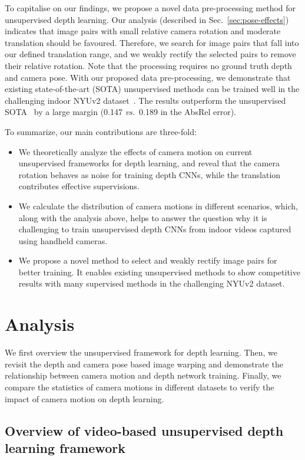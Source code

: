 \documentclass{article}
\newcommand{\secref}[1]{Sec.~\ref{#1}}
\def\vs{\emph{vs.}}
\begin{document}
To capitalise on our findings, we propose a novel data pre-processing method for unsupervised depth learning. Our analysis (described in \secref{sec:pose-effects}) indicates that image pairs with small relative camera rotation and moderate translation should be favoured.
Therefore, we search for image pairs that fall into our defined translation range, and we weakly rectify the selected pairs to remove their relative rotation. Note that the processing requires no ground truth depth and camera pose. With our proposed data pre-processing, we demonstrate that existing state-of-the-art (SOTA) unsupervised methods can be trained well in the challenging indoor NYUv2 dataset~\cite{silberman2012indoor}. The results outperform the unsupervised SOTA~\cite{zhao2020towards} by a large margin (0.147 \vs\ 0.189 in the AbsRel error).

To summarize, our main contributions are three-fold:
\begin{itemize}
    \item We theoretically analyze the effects of camera motion on current unsupervised frameworks for depth learning, and reveal that the camera rotation behaves as noise for training depth CNNs, while the translation contributes effective supervisions.
    \item We calculate the distribution of camera motions in different scenarios, which, along with the analysis above, helps to answer the question why it is challenging to train unsupervised depth CNNs from indoor videos captured using handheld cameras.
    \item We propose a novel method to select and weakly rectify image pairs for better training. It enables existing unsupervised methods to show competitive results with many supervised methods in the challenging NYUv2 dataset.
\end{itemize}

\section{Analysis}

We first overview the unsupervised framework for depth learning.
Then, we revisit the depth and camera pose based image warping and demonstrate the relationship between camera motion and depth network training.
Finally, we compare the statistics of camera motions in different datasets to verify the impact of camera motion on depth learning.

\subsection{Overview of video-based unsupervised depth learning framework}\label{sec:sc-overview}
\end{document}
